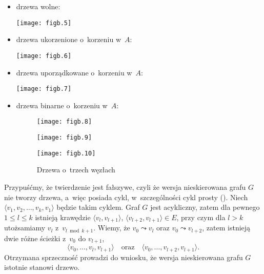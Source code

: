 
\exercise %
\begin{itemize}
	\item drzewa wolne:
	\begin{center}
		\texttt{[image: figb.5]}
	\end{center}
	\item drzewa ukorzenione o~korzeniu w~$A$:
	\begin{center}
		\texttt{[image: figb.6]}
	\end{center}
	\item drzewa uporządkowane o~korzeniu w~$A$:
	\begin{center}
		\texttt{[image: figb.7]}
	\end{center}
	\item drzewa binarne o~korzeniu w~$A$:
	\begin{figure}[ht]
		\begin{center}
			\texttt{[image: figb.8]}
		\end{center}
		\begin{center}
			\texttt{[image: figb.9]}
		\end{center}
		\begin{center}
			\texttt{[image: figb.10]}
		\end{center}
		\caption{Drzewa o~trzech węzłach}
	\end{figure}
\end{itemize}

\exercise %
Przypuśćmy, że twierdzenie jest fałszywe, czyli że wersja nieskierowana grafu $G$ nie tworzy drzewa, a~więc posiada cykl, w~szczególności cykl prosty (). Niech $\langle v_1,v_2,\dots,v_k,v_1\rangle$ będzie takim cyklem. Graf $G$ jest acykliczny, zatem dla pewnego $1\le l\le k$ istnieją krawędzie $\langle v_l,v_{l+1}\rangle$, $\langle v_{l+2},v_{l+1}\rangle\in E$, przy czym dla $l>k$ utożsamiamy $v_l$ z~$v_{l\bmod k+1}$. Wiemy, że $v_0\leadsto v_l$ oraz $v_0\leadsto v_{l+2}$, zatem istnieją dwie różne ścieżki z~$v_0$ do $v_{l+1}$,
\[
	\langle v_0,\dots,v_l,v_{l+1}\rangle \quad\text{oraz}\quad \langle v_0,\dots,v_{l+2},v_{l+1}\rangle.
\]
Otrzymana sprzeczność prowadzi do wniosku, że wersja nieskierowana grafu $G$ istotnie stanowi drzewo.

